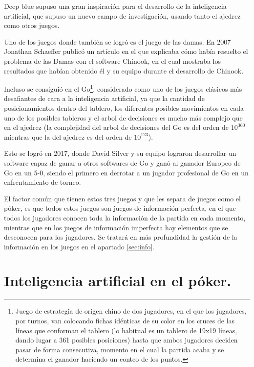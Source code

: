 Deep blue supuso una gran inspiración para el desarrollo de la inteligencia artificial, que supuso un nuevo campo de investigación, usando tanto el ajedrez como otros juegos. 

Uno de los juegos donde también se logró es el juego de las damas. En 2007 Jonathan Schaeffer publicó un artículo en el que explicaba cómo había resuelto el problema de las Damas con el software Chinook, en el cual mostraba los resultados que habían obtenido él y su equipo durante el desarrollo de Chinook. \cite{chinook}

Incluso se consiguió en el Go\footnote{Juego de estrategia de origen chino de dos jugadores, en el que los jugadores, por turnos, van colocando fichas idénticas de su color en los cruces de las líneas que conforman el tablero (lo habitual es un tablero de 19x19 líneas, dando lugar a 361 posibles posiciones) hasta que ambos jugadores deciden pasar de forma consecutiva, momento en el cual la partida acaba y se determina el ganador haciendo un conteo de los puntos.}, considerado como uno de los juegos clásicos más desafiantes de cara a la inteligencia artificial, ya que la cantidad de posicionamientos dentro del tablero, los diferentes posibles movimientos en cada uno de los posibles tableros y el arbol de decisiones es mucho más complejo que en el ajedrez (la complejidad del arbol de decisiones del Go es del orden de $10^{360}$ mientras que la del ajedrez es del orden de $10^{123}$). \cite{gametree} 

Esto se logró en 2017, donde David Silver y su equipo lograron desarrollar un software capaz de ganar a otros softwares de Go y ganó al ganador Europeo de Go en un 5-0, siendo el primero en derrotar a un jugador profesional de Go en un enfrentamiento de torneo.\cite{Go}

El factor común que tienen estos tres juegos y que les separa de juegos como el póker, es que todos estos juegos son juegos de información perfecta, en el que todos los jugadores conocen toda la información de la partida en cada momento, mientras que en los juegos de información imperfecta hay elementos que se desconocen para los jugadores. Se tratará en más profundidad la gestión de la información en los juegos en el apartado \ref{sec:info}.



\section{Inteligencia artificial en el póker.}

